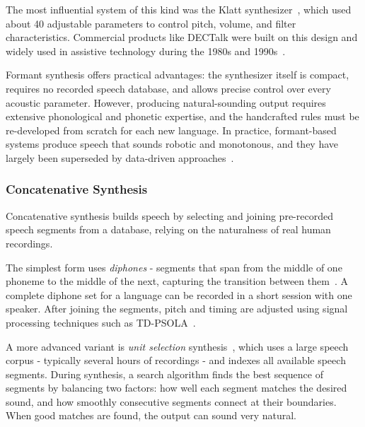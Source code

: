 \documentclass[
         english, %
    monochrome, %
]{VUMIFSEMasterThesis}
\begin{document}
The most influential system of this kind was the Klatt synthesizer~\cite{klatt1980software}, which used about 40 adjustable parameters to control pitch, volume, and filter characteristics. Commercial products like DECTalk were built on this design and widely used in assistive technology during the 1980s and 1990s~\cite{hallahan1995dectalk}.

Formant synthesis offers practical advantages: the synthesizer itself is compact, requires no recorded speech database, and allows precise control over every acoustic parameter. However, producing natural-sounding output requires extensive phonological and phonetic expertise, and the handcrafted rules must be re-developed from scratch for each new language. In practice, formant-based systems produce speech that sounds robotic and monotonous, and they have largely been superseded by data-driven approaches~\cite{reddy2023speech}.

\subsubsection{Concatenative Synthesis}

Concatenative synthesis builds speech by selecting and joining pre-recorded speech segments from a database, relying on the naturalness of real human recordings.

The simplest form uses \emph{diphones} - segments that span from the middle of one phoneme to the middle of the next, capturing the transition between them~\cite{dutoit1997high}. A complete diphone set for a language can be recorded in a short session with one speaker. After joining the segments, pitch and timing are adjusted using signal processing techniques such as TD-PSOLA~\cite{laprie1998automatic, toma2010td}.

A more advanced variant is \emph{unit selection} synthesis~\cite{hunt1996unit}, which uses a large speech corpus - typically several hours of recordings - and indexes all available speech segments. During synthesis, a search algorithm finds the best sequence of segments by balancing two factors: how well each segment matches the desired sound, and how smoothly consecutive segments connect at their boundaries. When good matches are found, the output can sound very natural.
\end{document}
